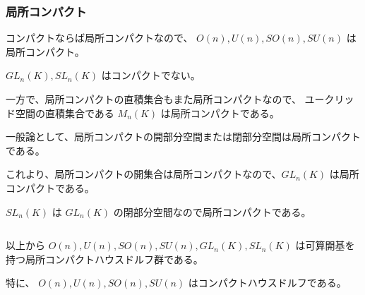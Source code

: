\documentclass[uplatex,a4j,12pt,dvipdfmx]{jsarticle}
\begin{document}
\subsubsection{局所コンパクト}

コンパクトならば局所コンパクトなので、
$O(n),U(n),SO(n),SU(n)$ は局所コンパクト。

$GL_{n}(K), SL_{n}(K)$ はコンパクトでない。

一方で、局所コンパクトの直積集合もまた局所コンパクトなので、
ユークリッド空間の直積集合である $M_{n}(K)$ は局所コンパクトである。

一般論として、局所コンパクトの開部分空間または閉部分空間は局所コンパクトである。

これより、局所コンパクトの開集合は局所コンパクトなので、$GL_{n}(K)$ は局所コンパクトである。

$SL_{n}(K)$ は $GL_{n}(K)$ の閉部分空間なので局所コンパクトである。

${}$

以上から
$O(n),U(n),SO(n),SU(n),GL_{n}(K),SL_{n}(K)$
は可算開基を持つ局所コンパクトハウスドルフ群である。

特に、
$O(n),U(n),SO(n),SU(n)$
はコンパクトハウスドルフである。
\end{document}
